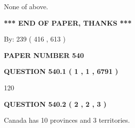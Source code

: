 \documentclass[12pt]{article}
\begin{document}
 
\noindent{}
 
 
 None of above.
 
 
 
 
   
   
 \vspace{0.2in}
 
   
   
   
   
\vspace{1.0in} 
{\textbf{\large{ *** END OF PAPER, THANKS *** }}} 
   
   
\hspace{1.0in} By: 
 239 ( 416 ,  613 )
   
   
   
   
\newpage 
\setcounter{page}{ 
   540001 } 
   
   
   
   
 {\textbf{ \Large{ PAPER NUMBER  540  }}}
   
   
\vspace{0.2in}
   
   
   
   
   
   
 \vspace{0.2in}
 
 
 
 
   
   
  
\vspace{0.2in}
  
{\textbf{\Large{QUESTION
540.1 
 ( 1 , 1 , 6791 )
}}}
  
  
 
 
\noindent{}

120
 
 
  
\vspace{0.2in}
  
{\textbf{\Large{QUESTION
540.2 
 ( 2 , 2 , 3 )
}}}
  
  
 
 
\noindent{}
 
 
Canada has 10  provinces and 3 territories.
 
\end{document}
